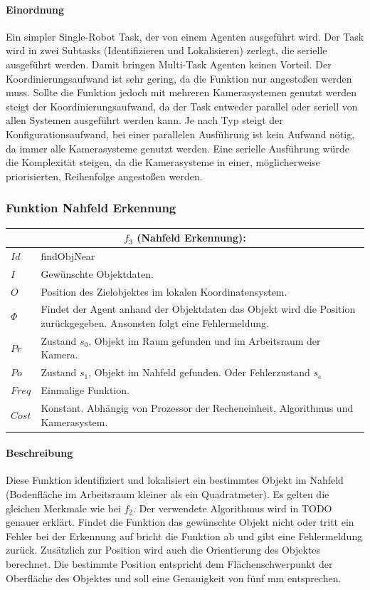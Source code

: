 \paragraph{Einordnung}
Ein simpler Single-Robot Task, der von einem Agenten ausgeführt wird. Der Task wird in zwei Subtasks (Identifizieren und Lokalisieren) zerlegt, die serielle ausgeführt werden. Damit bringen Multi-Task Agenten keinen Vorteil. Der Koordinierungsaufwand ist sehr gering, da die Funktion nur angestoßen werden muss. Sollte die Funktion jedoch mit mehreren Kamerasystemen genutzt werden steigt der Koordinierungsaufwand, da der Task entweder parallel oder seriell von allen Systemen ausgeführt werden kann. Je nach Typ steigt der Konfigurationsaufwand, bei einer parallelen Ausführung ist kein Aufwand nötig, da immer alle Kamerasysteme genutzt werden. Eine serielle Ausführung würde die Komplexität steigen, da die Kamerasysteme in einer, möglicherweise priorisierten, Reihenfolge angestoßen werden.

\subsubsection{Funktion Nahfeld Erkennung}
\label{sec:funnah}

\begin{tabular}{|p{3cm}|p{10cm}|}
	\multicolumn{2}{c}{$f_3$ (Nahfeld Erkennung):}\\
	\hline  $Id$ & findObjNear\\ 
	\hline  $I$ & Gewünschte Objektdaten. \\ 
	\hline  $O$ & Position des Zielobjektes im lokalen Koordinatensystem. \\ 
	\hline  $\Phi$ & Findet der Agent anhand der Objektdaten das Objekt wird die Position zurückgegeben. Ansonsten folgt eine Fehlermeldung.\\ 
	\hline $Pr$ & Zustand $s_0$, Objekt im Raum gefunden und im Arbeitsraum der Kamera. \\ 
	\hline $Po$ & Zustand $s_1$, Objekt im Nahfeld gefunden. Oder Fehlerzustand $s_e$\\ 
	\hline $Freq$ & Einmalige Funktion.\\ 
	\hline $Cost$ & Konstant. Abhängig von Prozessor der Recheneinheit, Algorithmus und Kamerasystem. \\
	\hline
\end{tabular} 

\paragraph{Beschreibung}
Diese Funktion identifiziert und lokalisiert ein bestimmtes Objekt im Nahfeld (Bodenfläche im Arbeitsraum kleiner als ein Quadratmeter). Es gelten die gleichen Merkmale wie bei $f_2$. Der verwendete Algorithmus wird in TODO genauer erklärt. Findet die Funktion das gewünschte Objekt nicht oder tritt ein Fehler bei der Erkennung auf bricht die Funktion ab und gibt eine Fehlermeldung zurück. Zusätzlich zur Position wird auch die Orientierung des Objektes berechnet. Die bestimmte Position entspricht dem Flächenschwerpunkt der Oberfläche des Objektes und soll eine Genauigkeit von fünf mm entsprechen.

